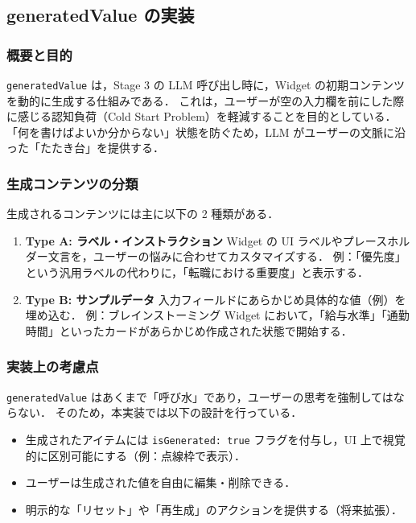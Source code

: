 \documentclass[a4paper,10pt]{jarticle}
\begin{document}
\subsection{generatedValue の実装}

\subsubsection{概要と目的}
\texttt{generatedValue} は，Stage 3 の LLM 呼び出し時に，Widget の初期コンテンツを動的に生成する仕組みである．
これは，ユーザーが空の入力欄を前にした際に感じる認知負荷（Cold Start Problem）を軽減することを目的としている．
「何を書けばよいか分からない」状態を防ぐため，LLM がユーザーの文脈に沿った「たたき台」を提供する．

\subsubsection{生成コンテンツの分類}
生成されるコンテンツには主に以下の 2 種類がある．

\begin{enumerate}
  \item \textbf{Type A: ラベル・インストラクション}
    Widget の UI ラベルやプレースホルダー文言を，ユーザーの悩みに合わせてカスタマイズする．
    例：「優先度」という汎用ラベルの代わりに，「転職における重要度」と表示する．
  \item \textbf{Type B: サンプルデータ}
    入力フィールドにあらかじめ具体的な値（例）を埋め込む．
    例：ブレインストーミング Widget において，「給与水準」「通勤時間」といったカードがあらかじめ作成された状態で開始する．
\end{enumerate}

\subsubsection{実装上の考慮点}
\texttt{generatedValue}  はあくまで「呼び水」であり，ユーザーの思考を強制してはならない．
そのため，本実装では以下の設計を行っている．
\begin{itemize}
  \item 生成されたアイテムには \texttt{isGenerated: true} フラグを付与し，UI 上で視覚的に区別可能にする（例：点線枠で表示）．
  \item ユーザーは生成された値を自由に編集・削除できる．
  \item 明示的な「リセット」や「再生成」のアクションを提供する（将来拡張）．
\end{itemize}
\end{document}
